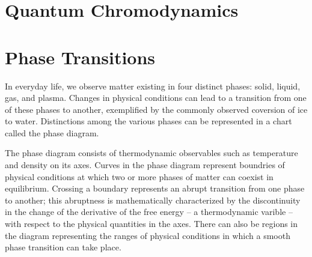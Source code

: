 
\section{Quantum Chromodynamics}
\section{Phase Transitions}
In everyday life, we observe matter existing in four distinct phases: solid, liquid, gas, and plasma. Changes in physical conditions can lead to a transition from one of these phases to another, exemplified by the commonly observed coversion of ice to water. Distinctions among the various phases can be represented in a chart called the phase diagram.

The phase diagram consists of thermodynamic observables such as temperature and density on its axes. Curves in the phase diagram represent boundries of physical conditions at which two or more phases of matter can coexist in equilibrium. Crossing a boundary represents an abrupt transition from one phase to another; this abruptness is mathematically characterized by the discontinuity in the change of the derivative of the free energy -- a thermodynamic varible -- with respect to the physical quantities in the axes. There can also be regions in the diagram representing the ranges of physical conditions in which a smooth phase transition can take place.

